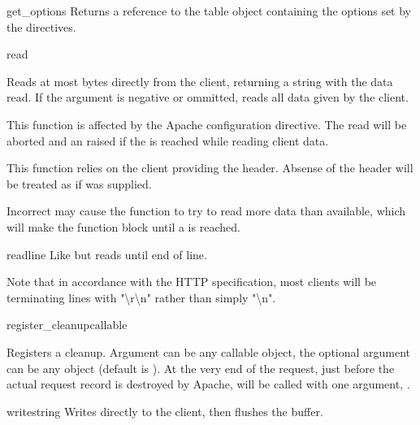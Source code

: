 \begin{methoddesc}[Request]{get_options}{}
Returns a reference to the table object containing the options set by
the  directives.
\end{methoddesc}


\begin{methoddesc}[Request]{read}{}

Reads at most  bytes directly from the client, returning a
string with the data read. If the  argument is negative or
ommitted, reads all data given by the client.

This function is affected by the  Apache configuration
directive. The read will be aborted and an  raised
if the  is reached while reading client data.

This function relies on the client providing the 
header. Absense of the  header will be treated as
if  was supplied.

Incorrect  may cause the function to try to read
more data than available, which will make the function block until a
 is reached.

\end{methoddesc}

\begin{methoddesc}[Request]{readline}{}
Like  but reads until end of line. 
                  
Note that in accordance with the HTTP specification, most clients will
be terminating lines with "\textbackslash r\textbackslash n" rather
than simply "\textbackslash n".

\end{methoddesc}

\begin{methoddesc}[Request]{register_cleanup}{callable}

Registers a cleanup. Argument  can be any callable
object, the optional argument  can be any object (default is
). At the very end of the request, just before the actual
request record is destroyed by Apache,  will be called
with one argument, .

\end{methoddesc}

\begin{methoddesc}[Request]{write}{string}
Writes  directly to the client, then flushes the buffer. 
\end{methoddesc}


